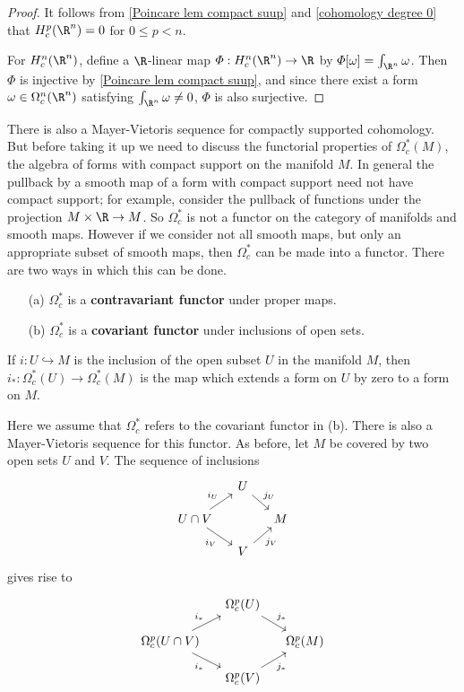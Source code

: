 \begin{proof}
It follows from \cref{Poincare lem compact suup} and \cref{cohomology degree 0} that $H^p_c(\R^n)=0$ for $0\leq p<n$.\par 
For $H^n_c(\R^n)$, define a $\R$-linear map $\varPhi:H^n_c(\R^n)\to\R$ by $\varPhi[\omega]=\int_{\R^n}\omega$. Then $\varPhi$ is injective by \cref{Poincare lem compact suup}, and since there exist a form $\omega\in\Omega^n_c(\R^n)$ satisfying $\int_{\R^n}\omega\neq 0$, $\varPhi$ is also surjective.
\end{proof}
There is also a Mayer-Vietoris sequence for compactly supported cohomology. But before taking it up we need to discuss the functorial properties of $\Omega_c^*(M)$, the 
algebra of forms with compact support on the manifold $M$. In general the pullback by a smooth map of a form with compact support need not have compact support; for 
example, consider the pullback of functions under the projection $M\times\R\to M$. So $\Omega_c^*$ is not a functor on the category of manifolds and smooth maps. However 
if we consider not all smooth maps, but only an appropriate subset of smooth maps, then $\Omega_c^*$ can be made into a functor. There are two ways in which this can be 
done.
\begin{itemize}
\item[(a)] $\Omega_c^*$ is a \textbf{contravariant functor} under proper maps.
\item[(b)] $\Omega_c^*$ is a \textbf{covariant functor} under inclusions of open sets.
\end{itemize}
If $i:U\hookrightarrow M$ is the inclusion of the open subset $U$ in the manifold $M$, then $i_*:\Omega_c^*(U)\to\Omega_c^*(M)$ is the map which extends a form on $U$ by 
zero to a form on $M$.\par
Here we assume that $\Omega_c^*$ refers to the covariant functor in (b). There is also a Mayer-Vietoris sequence for this functor. As before, let $M$ be covered by two 
open sets $U$ and $V$. The sequence of inclusions
\[\begin{tikzcd}[row sep=12pt,column sep=12pt]
&U\ar[rd,"j_U"]&\\
U\cap V\ar[ru,"i_U"]\ar[rd,swap,"i_V"]&&M\\
&V\ar[ru,swap,"j_V"]&
\end{tikzcd}\]
gives rise to
\[\begin{tikzcd}[row sep=12pt,column sep=12pt]
&\Omega^p_c(U)\ar[rd,"j_*"]&\\
\Omega^p_c(U\cap V)\ar[ru,"i_*"]\ar[rd,swap,"i_*"]&&\Omega^p_c(M)\\
&\Omega^p_c(V)\ar[ru,swap,"j_*"]&
\end{tikzcd}\]
